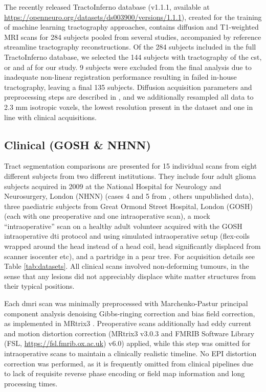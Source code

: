 The recently released TractoInferno database (v1.1.1, available at \url{https://openneuro.org/datasets/ds003900/versions/1.1.1}),\autocite{Poulin2022} created for the training of machine learning tractography approaches, contains diffusion and T1-weighted MRI scans for 284 subjects pooled from several studies, accompanied by reference streamline tractography reconstructions.
Of the 284 subjects included in the full TractoInferno database, we selected the 144 subjects with tractography of the \gls{cst}, \gls{or} and \gls{af} for our study.
9 subjects were excluded from the final analysis due to inadequate non-linear registration performance resulting in failed in-house tractography, leaving a final 135 subjects.
Diffusion acquisition parameters and preprocessing steps are described in \textcite{Poulin2022}, and we additionally resampled all data to 2.3 mm isotropic voxels, the lowest resolution present in the dataset and one in line with clinical acquisitions.

\subsection{Clinical (GOSH \& NHNN)}

Tract segmentation comparisons are presented for 15 individual scans from eight different subjects from two different institutions.
They include four adult glioma subjects acquired in 2009 at the National Hospital for Neurology and Neurosurgery, London (NHNN) (cases 4 and 5 from \textcite{Mancini2022}, others unpublished data),
three paediatric subjects from Great Ormond Street Hospital, London (GOSH) (each with one preoperative and one intraoperative scan),
a mock “intraoperative” scan on a healthy adult volunteer acquired with the GOSH intraoperative \gls{dti} protocol and using simulated intraoperative setup (flex-coils wrapped around the head instead of a head coil, head significantly displaced from scanner isocenter etc),
and a partridge in a pear tree.
For acquisition details see Table \ref{tab:datasets}.
All clinical scans involved non-deforming tumours, in the sense that any lesions did not appreciably displace white matter structures from their typical positions.

Each \gls{dmri} scan was minimally preprocessed with Marchenko-Pastur principal component analysis denoising\autocite{Veraart2016, Cordero-Grande2019} Gibbs-ringing correction\autocite{Kellner2016} and bias field correction,\autocite{Zhang2001, Smith2004} as implemented in MRtrix3 \autocite{Tournier2019}.
Preoperative scans additionally had eddy current and motion distortion correction\autocite{Andersson2016a, Smith2004} (MRtrix3 v3.0.3 and FMRIB Software Library (FSL, \url{https://fsl.fmrib.ox.ac.uk}) v6.0) applied, while this step was omitted for intraoperative scans to maintain a clinically realistic timeline.
No EPI distortion correction was performed, as it is frequently omitted from clinical pipelines due to lack of requisite reverse phase encoding or field map information and long processing times.\autocite{Yang2022}

